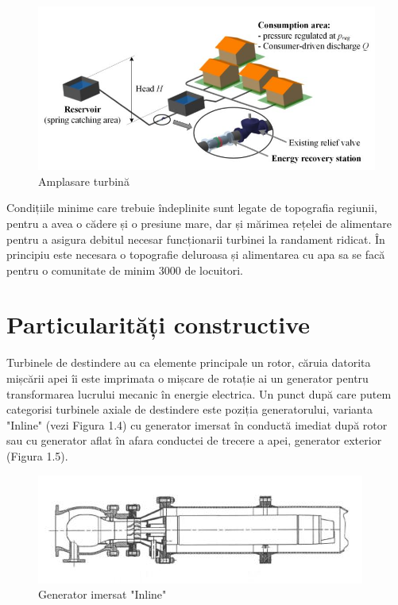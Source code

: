 \begin{figure}[h!]
	\centering
	\includegraphics[scale=0.5]{figures/amplasare_turbina.jpg}
	\caption{Amplasare turbină \cite{andolfatto2016simulation}}
	\label{Amplasare turbin\u{a}}
\end{figure}

Condițiile minime care trebuie îndeplinite sunt legate de topografia regiunii, pentru a avea o cădere și o presiune mare, dar și mărimea rețelei de alimentare pentru a asigura debitul necesar funcționarii turbinei la randament ridicat. În principiu este necesara o topografie deluroasa și alimentarea cu apa sa se facă pentru o comunitate de minim 3000 de locuitori.


\section{Particularități constructive}

Turbinele de destindere au ca elemente principale un rotor, căruia datorita mișcării apei îi este imprimata o mișcare de rotație ai un generator pentru transformarea lucrului mecanic în energie electrica. Un punct după care putem categorisi turbinele axiale de destindere este poziția generatorului, varianta "Inline" (vezi Figura 1.4) cu generator imersat în conductă imediat după rotor sau cu generator aflat în afara conductei de trecere a apei, generator exterior (Figura 1.5).

\begin{figure}[h!]
	\centering
	\includegraphics[scale=1]{figures/generator_inline.jpg}
	\caption{Generator imersat "Inline" \cite{GREES_2014}}
	\label{Generator imersat Inline}
\end{figure}

